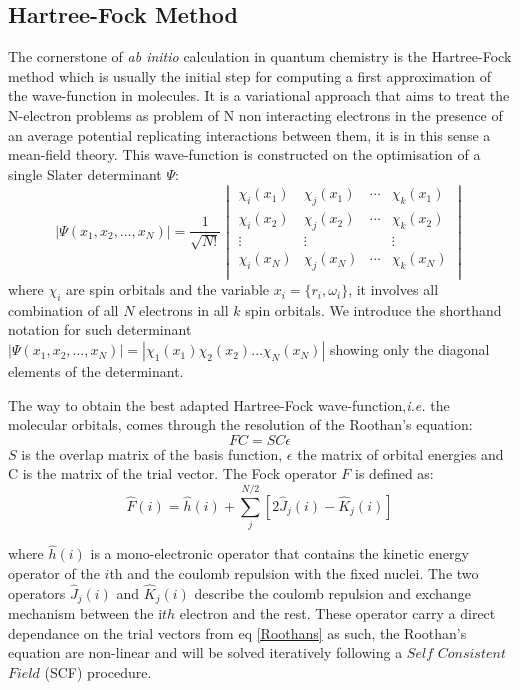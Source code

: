 \documentclass[12pt]{report}
\numberwithin{equation}{section}
\begin{document}
\subsection{Hartree-Fock Method}
The cornerstone of \textit{ab initio} calculation in quantum chemistry is the Hartree-Fock method which is usually the initial step for computing a first approximation of the wave-function in molecules. 
It is a variational approach that aims to treat the N-electron problems as problem of N non interacting electrons in the presence of an average potential replicating interactions between them, it is in this sense a mean-field theory.
This wave-function is constructed on the optimisation of a single Slater determinant $\Psi$:
\begin{equation}
    |\Psi(x_1,x_2,\ldots,x_N)|=\frac{1}{\sqrt{N!}}
    \begin{vmatrix}
        \chi_i (x_1) & \chi_j (x_1) & \cdots & \chi_k (x_1)\\
        \chi_i (x_2) & \chi_j (x_2) & \cdots & \chi_k (x_2)\\
        \vdots & \vdots &   &  \vdots\\
        \chi_i (x_N) & \chi_j (x_N) & \cdots & \chi_k (x_N)\\
    \end{vmatrix}
\end{equation}
where $\chi_i$ are spin orbitals and the variable $x_i=\{r_i,\omega_i\}$, it involves all combination of all $N$ electrons in all $k$ spin orbitals. 
We introduce the shorthand notation for such determinant $|\Psi(x_1,x_2,\ldots,x_N)|=|\chi_1(x_1)\chi_2(x_2)\ldots\chi_N(x_N)|$ showing only the diagonal elements of the determinant.

The way to obtain the best adapted Hartree-Fock wave-function,\textit{i.e.} the molecular orbitals, comes through the resolution of the Roothan's equation:
\begin{equation}\label{Roothans}
    FC=SC\epsilon
\end{equation}
$S$ is the overlap matrix of the basis function, $\epsilon$ the matrix of orbital energies and C is the matrix of the trial vector.
The Fock operator $F$ is defined as:
\begin{equation}
    \hat{F}(i)=\hat{h}(i)+\sum_{j}^{N/2}[2\hat{J}_{j}(i)-\hat{K}_{j}(i)]
\end{equation}

where $\hat{h}(i)$ is a mono-electronic operator that contains the kinetic energy operator of the $i$th and the coulomb repulsion with the fixed nuclei.
The two operators $\hat{J}_{j}(i)$ and $\hat{K}_{j}(i)$ describe the coulomb repulsion and exchange mechanism between the i$th$ electron and the rest.
These operator carry a direct dependance on the trial vectors from eq \ref{Roothans} as such, the Roothan's equation are non-linear and will be solved iteratively following a $Self$ $Consistent$ $Field$ (SCF) procedure.
\end{document}
